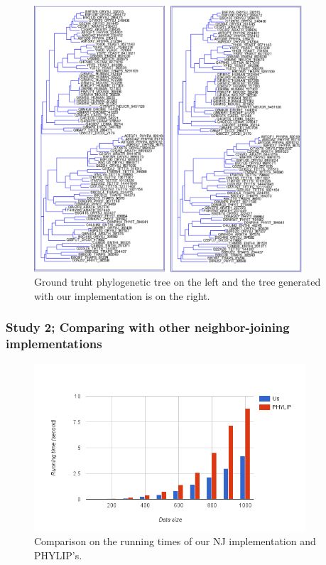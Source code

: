 \documentclass[11pt,letterpaper]{article}
\theoremstyle{definition}
\begin{document}
\begin{figure}[h!]
  \centering
  \includegraphics[width=0.89\textwidth]{gt-kimura.jpg}
  \caption{Ground truht phylogenetic tree on the left and the tree generated with our implementation is on the right.}
  \label{fig:gt-kimura}
\end{figure}


\subsubsection{Study 2; Comparing with other neighbor-joining implementations}

\begin{figure}[t]
  \centering
  \includegraphics[width=0.9\textwidth]{runningtime.png}
  \caption{Comparison on the running times of our NJ implementation and PHYLIP's.}
  \label{fig:runningtime}
\end{figure}
\end{document}
